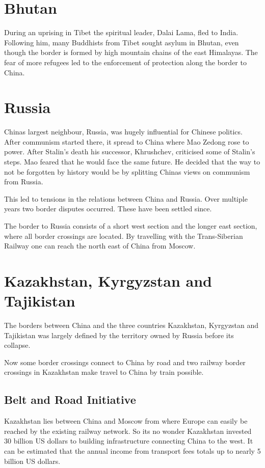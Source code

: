 \documentclass[conference]{IEEEtran}
\begin{document}
	\section{Bhutan}
	During an uprising in Tibet the spiritual leader, Dalai Lama, fled to India. Following him, many Buddhists from Tibet sought asylum in Bhutan, even though the border is formed by high mountain chains of the east Himalayas. The fear of more refugees led to the enforcement of protection along the border to China.
	
	\section{Russia}
	Chinas largest neighbour, Russia, was hugely influential for Chinese politics. After communism started there, it spread to China where Mao Zedong rose to power. After Stalin's death his successor, Khrushchev, criticised some of Stalin's steps. Mao feared that he would face the same future. He decided that the way to not be forgotten by history would be by splitting Chinas views on communism from Russia.
	
	This led to tensions in the relations between China and Russia. Over multiple years two border disputes occurred. These have been settled since.
	
	The border to Russia consists of a short west section and the longer east section, where all border crossings are located. By travelling with the Trans-Siberian Railway one can reach the north east of China from Moscow.
	
	\section{Kazakhstan, Kyrgyzstan and Tajikistan}
	The borders between China and the three countries Kazakhstan, Kyrgyzstan and Tajikistan was largely defined by the territory owned by Russia before its collapse.
	
	Now some border crossings connect to China by road and two railway border crossings in Kazakhstan make travel to China by train possible.
	
	\subsection{Belt and Road Initiative}
	Kazakhstan lies between China and Moscow from where Europe can easily be reached by the existing railway network. So its no wonder Kazakhstan invested 30 billion US dollars to building infrastructure connecting China to the west. It can be estimated that the annual income from transport fees totals up to nearly 5 billion US dollars.
	
\end{document}
